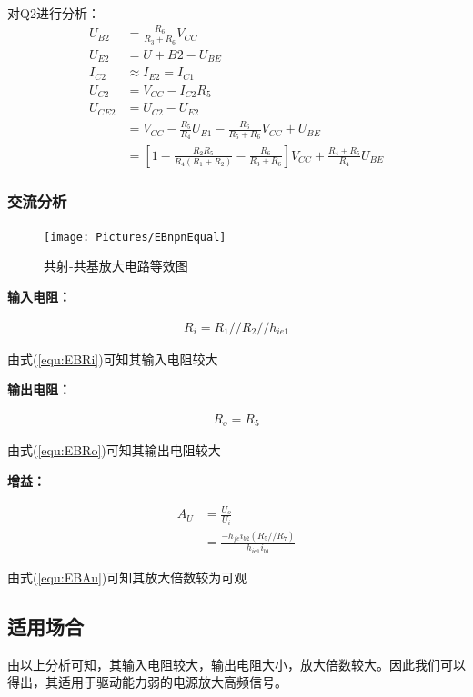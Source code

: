 \documentclass[11pt,a4paper,UTF8]{ctexart}
\begin{document}
			对Q2进行分析：
			\begin{align}
				U_{B2} &= \frac{R_6}{R_3+R_6}V_{CC} \\
				U_{E2} &= U+{B2} - U_{BE} \\
				I_{C2} &\approx I_{E2} = I_{C1} \\
				U_{C2} &= V_{CC} - I_{C2}R_5 \\
				U_{CE2} &= U_{C2} - U_{E2} \nonumber\\
				&= V_{CC} - \frac{R_5}{R_4}U_{E1} - \frac{R_6}{R_5+R_6}V_{CC} + U_{BE} \nonumber\\
				&= [1-\frac{R_2R_5}{R_4(R_1+R_2)} - \frac{R_6}{R_3+R_6}]V_{CC} + \frac{R_4+R_5}{R_4}U_{BE}
			\end{align}
			
			\subsubsection{交流分析}
				\begin{figure}[H]
					\centering
					\texttt{[image: Pictures/EBnpnEqual]}
					\caption{共射-共基放大电路等效图}
					\label{fig:ebnpnequal}
				\end{figure}
			
			\textbf{输入电阻：}
			
			\begin{align}
				R_i = R_1//R_2//h_{ie1} \label{equ:EBRi}
			\end{align}
			
			由式(\ref{equ:EBRi})可知其输入电阻较大
			
			\textbf{输出电阻：}
			
			\begin{align}
				R_o = R_5 \label{equ:EBRo}
			\end{align}
			
			由式(\ref{equ:EBRo})可知其输出电阻较大
			
			\textbf{增益：}
			
			\begin{align}
				A_U &= \frac{U_o}{U_i} \nonumber\\
				&= \frac{-h_{fe}i_{b2}(R_5//R_7)}{h_{ie1}i_{b1}} \label{equ:EBAu}
			\end{align}
			
			由式(\ref{equ:EBAu})可知其放大倍数较为可观
				
		\subsection{适用场合}
			由以上分析可知，其输入电阻较大，输出电阻大小，放大倍数较大。因此我们可以得出，其适用于驱动能力弱的电源放大高频信号。
			
\end{document}
